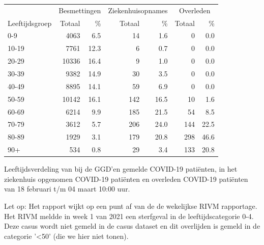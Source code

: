 \documentclass[
  english,
  man,floatsintext]{apa6}
\begin{document}
\begin{table}
\centering\begingroup\fontsize{11}{13}\selectfont

\begin{threeparttable}
\begin{tabular}{lrrrrrr}
\toprule
\multicolumn{1}{c}{ } & \multicolumn{2}{c}{Besmettingen} & \multicolumn{2}{c}{Ziekenhuisopnames} & \multicolumn{2}{c}{Overleden} \\
\cmidrule(l{3pt}r{3pt}){2-3} \cmidrule(l{3pt}r{3pt}){4-5} \cmidrule(l{3pt}r{3pt}){6-7}
Leeftijdsgroep & Totaal & \% & Totaal & \% & Totaal & \%\\
\midrule
0-9 & 4063 & 6.5 & 14 & 1.6 & 0 & 0.0\\
10-19 & 7761 & 12.3 & 6 & 0.7 & 0 & 0.0\\
20-29 & 10336 & 16.4 & 9 & 1.0 & 0 & 0.0\\
30-39 & 9382 & 14.9 & 30 & 3.5 & 0 & 0.0\\
40-49 & 8895 & 14.1 & 59 & 6.9 & 0 & 0.0\\
50-59 & 10142 & 16.1 & 142 & 16.5 & 10 & 1.6\\
60-69 & 6214 & 9.9 & 185 & 21.5 & 54 & 8.5\\
70-79 & 3612 & 5.7 & 206 & 24.0 & 144 & 22.5\\
80-89 & 1929 & 3.1 & 179 & 20.8 & 298 & 46.6\\
90+ & 534 & 0.8 & 29 & 3.4 & 133 & 20.8\\
\bottomrule
\end{tabular}
\begin{tablenotes}
\item[1] Leeftijdsverdeling van bij de GGD’en gemelde COVID-19 patiënten, in het ziekenhuis opgenomen COVID-19 patiënten en overleden COVID-19 patiënten van 18 februari t/m 04 maart 10:00 uur.
\item[2] Let op: Het rapport wijkt op een punt af van de de wekelijkse RIVM rapportage. Het RIVM meldde in week 1 van 2021 een sterfgeval in de leeftijdscategorie 0-4. Deze casus wordt niet gemeld in de casus dataset en dit overlijden is gemeld in de categorie '<50' (die we hier niet tonen).
\end{tablenotes}
\end{threeparttable}
\endgroup{}
\end{table}

\newpage
\end{document}
